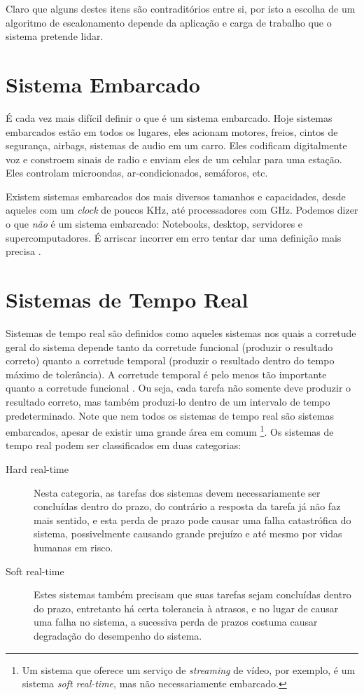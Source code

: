 Claro que alguns destes itens são contraditórios entre si, por isto a escolha de um algoritmo de escalonamento depende da aplicação e carga de trabalho que o sistema pretende lidar.


\section{Sistema Embarcado}

É cada vez mais difícil definir o que é um sistema embarcado. Hoje sistemas embarcados estão em todos os lugares, eles acionam motores, freios, cintos de segurança, airbags, sistemas de audio em um carro. Eles codificam digitalmente voz e constroem sinais de radio e enviam eles de um celular para uma estação. Eles controlam microondas, ar-condicionados, semáforos, etc.

Existem sistemas embarcados dos mais diversos tamanhos e capacidades, desde aqueles com um \emph{clock} de poucos KHz, até processadores com GHz. Podemos dizer o que \emph{não} é um sistema embarcado: Notebooks, desktop, servidores e supercomputadores. É arriscar incorrer em erro tentar dar uma definição mais precisa \cite{leeseshia}.

\section{Sistemas de Tempo Real}

Sistemas de tempo real são definidos como aqueles sistemas nos quais a corretude geral do sistema depende tanto da corretude funcional (produzir o resultado correto) quanto a corretude temporal (produzir o resultado dentro do tempo máximo de tolerância). A corretude temporal é pelo menos tão importante quanto a corretude funcional \cite{realtime}. Ou seja, cada tarefa não somente deve produzir o resultado correto, mas também produzi-lo dentro de um intervalo de tempo predeterminado. Note que nem todos os sistemas de tempo real são sistemas embarcados, apesar de existir uma grande área em comum \footnote{Um sistema que oferece um serviço de \emph{streaming} de vídeo, por exemplo, é um sistema \emph{soft real-time}, mas não necessariamente embarcado.}\cite{realtime}. Os sistemas de tempo real podem ser classificados em duas categorias:

\begin{description}
	\item[Hard real-time] Nesta categoria, as tarefas dos sistemas devem necessariamente ser concluídas dentro do prazo, do contrário a resposta da tarefa já não faz mais sentido, e esta perda de prazo pode causar uma falha catastrófica do sistema, possivelmente causando grande prejuízo e até mesmo por vidas humanas em risco.
	\item[Soft real-time] Estes sistemas também precisam que suas tarefas sejam concluídas dentro do prazo, entretanto há certa tolerancia à atrasos, e no lugar de causar uma falha no sistema, a sucessiva perda de prazos costuma causar degradação do desempenho do sistema.
\end{description}

